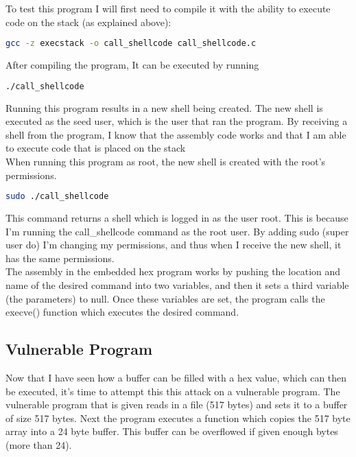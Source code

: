 \documentclass[14pt]{extarticle}
\begin{document}
To test this program I will first need to compile it with the ability to execute code on the stack (as explained above):
\begin{lstlisting}[language=sh]
     gcc -z execstack -o call_shellcode call_shellcode.c
\end{lstlisting}
After compiling the program, It can be executed by running
\begin{lstlisting}[language=sh]
    ./call_shellcode
\end{lstlisting}
Running this program results in a new shell being created. The new shell is executed as the seed user, which is the user that ran the program. By receiving a shell from the program, I know that the assembly code works and that I am able to execute code that is placed on the stack\\
When running this program as root, the new shell is created with the root's permissions.
\begin{lstlisting}[language=sh]
    sudo ./call_shellcode
\end{lstlisting}
This command returns a shell which is logged in as the user root. This is because I'm running the call\_shellcode command as the root user. By adding sudo (super user do) I'm changing my permissions, and thus when I receive the new shell, it has the same permissions.\\
The assembly in the embedded hex program works by pushing the location and name of the desired command into two variables, and then it sets a third variable (the parameters) to null. Once these  variables are set, the program calls the execve() function which executes the desired command.

\subsection{Vulnerable Program}
Now that I have seen how a buffer can be filled with a hex value, which can then be executed, it's time to attempt this this attack on a vulnerable program. The vulnerable program that is given reads in a file (517 bytes) and sets it to a buffer of size 517 bytes. Next the program executes a function which copies the 517 byte array into a 24 byte buffer. This buffer can be overflowed if given enough bytes (more than 24).
\end{document}
